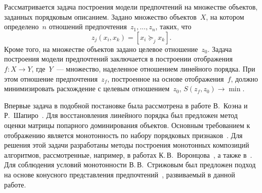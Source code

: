 \documentclass{elsarticle}
\begin{document}

Рассматривается задача построения модели предпочтений на множестве объектов, заданных порядковым описанием. Задано множество объектов~$X$, на котором определено~$n$ отношений предпочтения~$z_1,...,z_n$, таких, что
\[
z_j(x_i,x_k)=[x_i\succeq_j x_k].
\]
Кроме того, на множестве объектов задано целевое отношение~$z_0$. Задача построения модели предпочтений заключается в построении отображения~$f:X\rightarrow Y$, где~$Y$~--- множество, наделенное отношением линейного порядка. При этом отношение предпочтения~$z_f$, построенное на основе отображения~$f$, должно минимизировать расхождение с целевым отношением~$z_0$, $S(z_f,z_0)\rightarrow \min$. 

Впервые задача в подобной постановке была рассмотрена в работе В.~Коэна и Р.~Шапиро~\cite{Cohen1999}. Для восстановления линейного порядка был предложен метод оценки матрицы попарного доминирования объектов. Основным требованием к отображению является монотонность по набору порядковых признаков~\cite{duivesteijn2008knn, Cheng2010}. Для решения этой задачи разработаны методы построения монотонных композиций алгоритмов, рассмотренные, например, в работах К.\,В.~Воронцова~\cite{vorontsov1999local}, а также в~\cite{Corrente2013}. Для соблюдения условий монотонности В.\,В.~Стрижовым был предложен подход на основе конусного представления предпочтений~\cite{strijov11utochnenie_zldm}, развиваемый в данной работе.
\end{document}
